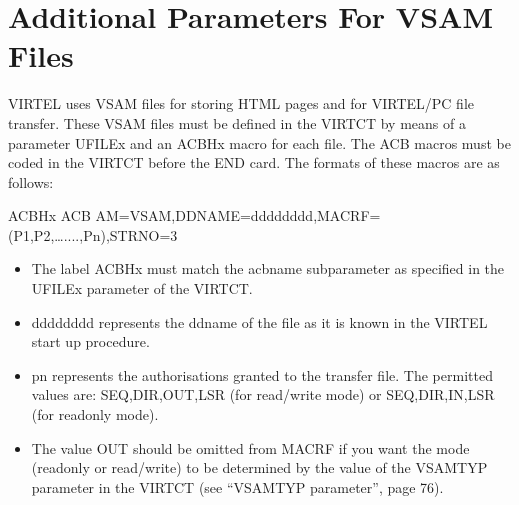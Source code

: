 \documentclass[letterpaper,10pt,english]{sphinxmanual}
\begin{document}
\newpage

\ignorespaces 

\section{Additional Parameters For VSAM Files}
\label{\detokenize{Installation_Guide:additional-parameters-for-vsam-files}}\label{\detokenize{Installation_Guide:v461ig-additional-parameters-for-vsam-files}}\label{\detokenize{Installation_Guide:index-145}}
\sphinxAtStartPar
VIRTEL uses VSAM files for storing HTML pages and for VIRTEL/PC file transfer. These VSAM files must be defined in the VIRTCT by means of a parameter UFILEx and an ACBHx macro for each file. The ACB macros must be coded in the VIRTCT before the END card. The formats of these macros are as follows:

\begin{sphinxVerbatim}[commandchars=\\\{\}]
ACBHx ACB AM=VSAM,DDNAME=dddddddd,MACRF=(P1,P2,…....,Pn),STRNO=3
\end{sphinxVerbatim}
\begin{itemize}
\item {} 
\sphinxAtStartPar
The label ACBHx must match the acbname subparameter as specified in the UFILEx parameter of the VIRTCT.

\item {} 
\sphinxAtStartPar
dddddddd represents the ddname of the file as it is known in the VIRTEL start up procedure.

\item {} 
\sphinxAtStartPar
pn represents the authorisations granted to the transfer file. The permitted values are: SEQ,DIR,OUT,LSR (for read/write mode) or SEQ,DIR,IN,LSR (for read\sphinxhyphen{}only mode).

\item {} 
\sphinxAtStartPar
The value OUT should be omitted from MACRF if you want the mode (read\sphinxhyphen{}only or read/write) to be determined by the value of the VSAMTYP parameter in the VIRTCT (see “VSAMTYP parameter”, page 76).

\end{itemize}

\newpage
{}\label{\detokenize{Installation_Guide:vvrrig-bookmark72}}
\ignorespaces 
\end{document}
